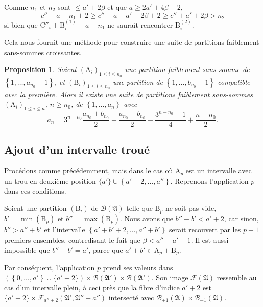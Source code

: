 \documentclass[11pt, oneside]{article}   	%
\newcommand{\interval}[2]{\left\{ #1, \dots, #2 \right\}}
\newtheorem{proposition}{Proposition}
\begin{document}
Comme $n_1$ et $n_2$ sont $\leqslant a' + 2 \beta$ et que $a \geqslant 2 a' + 4 \beta - 2$,
\begin{equation}
 c'' + a - n_1 + 2 \geqslant c'' + a - a' - 2 \beta + 2 \geqslant c'' + a' + 2 \beta > n_2
\end{equation}
si bien que $\mathrm{C}''_i + \mathrm{B}_i^{(1)} + a - n_1$ ne saurait rencontrer $\mathrm{B}_i^{(2)}$.

Cela nous fournit une méthode pour construire une suite de partitions faiblement sans-sommes croissantes.

\begin{proposition}
Soient $(\mathrm{A}_i)_{1 \leqslant i \leqslant n_0}$ une partition faiblement sans-somme de $\interval{1}{a_{n_0} - 1}$,
et $(\mathrm{B}_i)_{1 \leqslant i \leqslant n_0}$ une partition de $\interval{1}{b_{n_0} - 1}$ compatible avec la première.
Alors il existe une suite de partitions faiblement sans-sommes $(\mathrm{A}_i)_{1 \leqslant i \leqslant n}$, $n \geqslant n_0$,
de $\interval{1}{a_n}$ avec
\begin{equation}
 a_n = 3^{n - n_0} \frac{a_{n_0} + b_{n_0}}{2} + \frac{a_{n_0} - b_{n_0}}{2} - \frac{3^{n-n_0} - 1}{4} + \frac{n - n_0}{2}.
\end{equation}
\end{proposition}

\subsection{Ajout d'un intervalle troué}

Procédons comme précédemment, mais dans le cas où $\mathrm{A}_p$ est un intervalle avec un trou en deuxième position $\{a'\} \cup \interval{a' + 2}{a''}$.
Reprenons l'application $p$ dans ces conditions.

Soient une partition $(\mathrm{B}_i)$ de $\mathcal{B}(\mathfrak{A})$ telle que $\mathrm{B}_p$ ne soit pas vide,
$b' = \min(\mathrm{B}_p)$ et $b'' = \max(\mathrm{B}_p)$.
Nous avons que $b'' - b' < a' + 2$, car sinon,
$b'' > a'' + b'$ et l'intervalle $\interval{a' + b' + 2}{a'' + b'}$ serait recouvert par les $p - 1$ premiers ensembles,
contredisant le fait que $\beta < a'' - a' - 1$.
Il est aussi impossible que $b'' - b' = a'$, parce que $a' + b' \in \mathrm{A}_p + \mathrm{B}_p$.

Par conséquent, l'application $p$ prend ses valeurs dans $(\interval{0}{a'} \cup \{a' + 2\}) \times \mathcal{B}(\mathfrak{A}') \times \mathcal{B}(\mathfrak{A}')$.
Son image $\mathcal{F}(\mathfrak{A})$ ressemble au cas d'un intervalle plein,
à ceci près que la fibre d'indice $a' + 2$ est $\{a' + 2\} \times \mathcal{F}_{a'' + 2}(\mathfrak{A}', \mathfrak{A}'' - a'')$
intersecté avec $\mathcal{B}_{+1}(\mathfrak{A}) \times \mathcal{B}_{-1}(\mathfrak{A})$.
\end{document}

